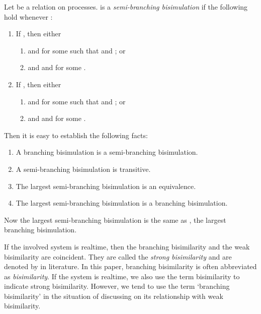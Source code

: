 \documentclass{llncs}
\begin{document}
\begin{definition}\label{def:semi-beq}
Let  be a relation on processes.  is a {\em semi-branching bisimulation}  if the following hold whenever :
\begin{enumerate}
\item
If , then either
 \begin{enumerate}
  \item
   and  for some  such that  and ; or

 \item
     and  and  for some .
 \end{enumerate}

\item
If  , then either
 \begin{enumerate}
 \item
     and
      for some  such that  and ; or

 \item
  and  and  for some .
 \end{enumerate}
\end{enumerate}
\end{definition}

Then it is easy to establish the following facts:
\begin{enumerate}
\item
A branching bisimulation is a semi-branching bisimulation.

\item
A semi-branching bisimulation is transitive.

\item
The largest semi-branching bisimulation is an equivalence.

\item
The largest semi-branching bisimulation is a branching bisimulation.
\end{enumerate}

Now the largest semi-branching bisimulation is the same as , the largest branching bisimulation.



If the involved system is realtime,  then the branching bisimilarity and the weak bisimilarity are coincident. They are called the {\em strong bisimilarity}  and are denoted by  in literature.
In this paper, branching bisimilarity is often abbreviated as {\em bisimilarity}. If the system is realtime, we also use the term bisimilarity to indicate strong bisimilarity.  However, we tend to use the term `branching bisimilarity' in the situation of discussing on its relationship with weak bisimilarity.
\end{document}
